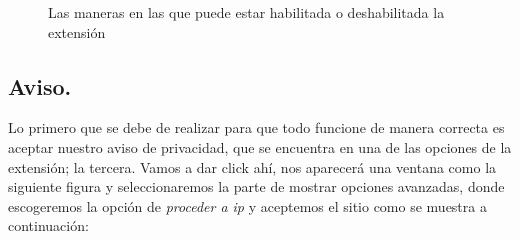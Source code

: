 \documentclass[12pt, a4paper, titlepage]{report}
\begin{document}
        \begin{figure}[H]
         \centering
         \caption[Extension habilitada / deshabilitada]{Las maneras en las que puede estar habilitada o deshabilitada la extensión}
         \label{fig:Habilitar/Deshabilitar}
        \end{figure}
        
        \subsection{Aviso.}
        Lo primero que se debe de realizar para que todo funcione de manera correcta es aceptar nuestro aviso de privacidad, que se encuentra en una de las opciones de la extensión; la tercera. Vamos a dar click ahí, nos aparecerá una ventana como la siguiente figura y seleccionaremos la parte de mostrar opciones avanzadas, donde escogeremos la opción de \textit{proceder a ip} y aceptemos el sitio como se muestra a continuación:
        
\end{document}
